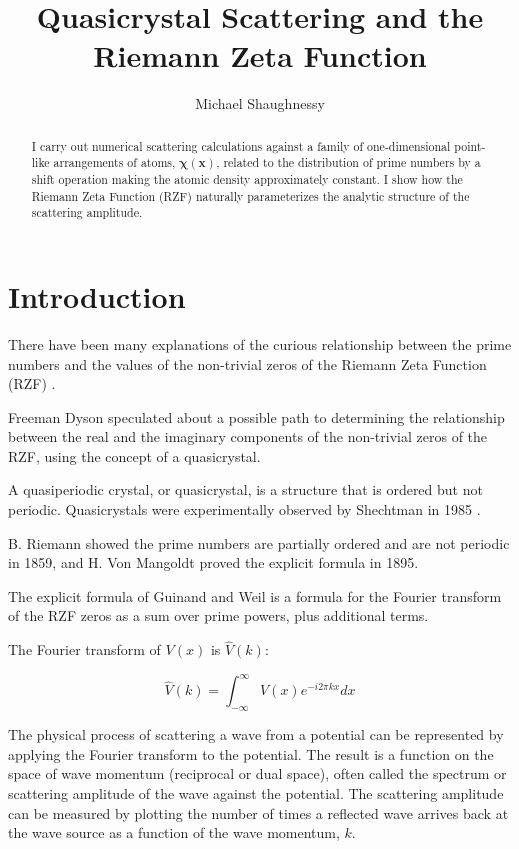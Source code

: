 \documentclass[11pt, oneside]{article}
\title{Quasicrystal Scattering and the Riemann Zeta Function}
\author{Michael Shaughnessy}
\begin{document}
\maketitle

\begin{abstract}
I carry out numerical scattering calculations against a family of one-dimensional point-like arrangements of atoms, $\mathbf{\chi(x)}$, related to the distribution of prime numbers by a shift operation making the atomic density approximately constant. 
I show how the Riemann Zeta Function (RZF) naturally parameterizes the analytic structure of the scattering amplitude.
\end{abstract}

\section{Introduction}

There have been many explanations of the curious relationship between the prime numbers and the values of the non-trivial zeros of the Riemann Zeta Function (RZF) \cite{Riemann1859, Selberg, Dyson, Zhang}.

Freeman Dyson \cite{Baez} speculated about a possible path to determining the relationship between the real and the imaginary components of the non-trivial zeros of the RZF, using the concept of a quasicrystal.

A quasiperiodic crystal, or quasicrystal, is a structure that is ordered but not periodic. Quasicrystals were experimentally observed by Shechtman in 1985 \cite{Shechtman1985}. 

B. Riemann showed the prime numbers are partially ordered and are not periodic \cite{Riemann1859} in 1859, and H. Von Mangoldt \cite{VonMangoldt1895} proved the explicit formula in 1895.

The explicit formula of Guinand and Weil \cite{Weil} is a formula for the Fourier transform of the RZF zeros as a sum over prime powers, plus additional terms.  

The Fourier transform of $V(x)$ is $\hat{V}(k)$:

\begin{equation}
\hat{V}(k) = \int_{-\infty}^{\infty}V(x)e^{-i2\pi kx}dx
\end{equation}

The physical process of scattering a wave from a potential can be represented by applying the Fourier transform to the potential. The result is a function on the space of wave momentum (reciprocal or dual space), often called the spectrum or scattering amplitude of the wave against the potential. The scattering amplitude can be measured by plotting the number of times a reflected wave arrives back at the wave source as a function of the wave momentum, $k$.
\end{document}
